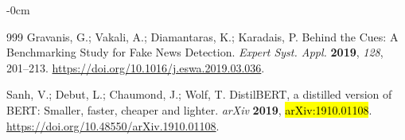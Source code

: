 \documentclass[informatics,article,accept,pdftex,moreauthors]{Definitions/mdpi}
\begin{document}
\begin{adjustwidth}{-\extralength}{0cm}
\begin{thebibliography}{999}
Gravanis, G.; Vakali, A.; Diamantaras, K.; Karadais, P. Behind the Cues: A Benchmarking Study for Fake News Detection. \textit{Expert Syst. Appl.} \textbf{2019}, \textit{128}, 201--213. \href{https://doi.org/10.1016/j.eswa.2019.03.036}{https://doi.org/10.1016/j.eswa.2019.03.036}.
 
Sanh, V.; Debut, L.; Chaumond, J.; Wolf, T. DistilBERT, a distilled version of BERT: Smaller, faster, cheaper and lighter. \textit{arXiv} \textbf{2019}, \hl{arXiv:1910.01108}. %
\href{https://doi.org/10.48550/arXiv.1910.01108}{https://doi.org/10.48550/arXiv.1910.01108}.
\end{thebibliography}
\PublishersNote{}
\end{adjustwidth}
\end{document}
